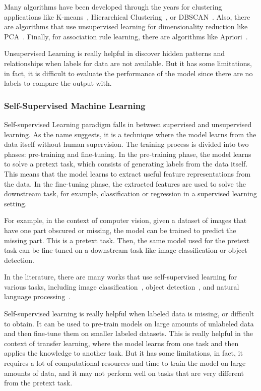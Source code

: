 Many algorithms have been developed through the years for clustering applications like K-means~\citep{macqueen1967some}, Hierarchical Clustering~\citep{johnson1967hierarchical}, or DBSCAN~\citep{ester1996density}.
Also, there are algorithms that use unsupervised learning for dimensionality reduction like PCA~\citep{jolliffe1986principal}.
Finally, for association rule learning, there are algorithms like Apriori~\citep{agrawal1994fast}.


Unsupervised Learning is really helpful in discover hidden patterns and relationships when labels for data are not available.
But it has some limitations, in fact, it is difficult to evaluate the performance of the model since there are no labels to compare the output with.



\subsubsection{Self-Supervised Machine Learning}
\label{subsubsec:semisupervised_ml}
Self-supervised Learning paradigm falls in between supervised and unsupervised learning.
As the name suggests, it is a technique where the model learns from the data itself without human supervision.
The training process is divided into two phases: pre-training and fine-tuning.
In the pre-training phase, the model learns to solve a pretext task, which consists of generating labels from the data itself.
This means that the model learns to extract useful feature representations from the data.
In the fine-tuning phase, the extracted features are used to solve the downstream task, for example, classification or regression in a supervised learning setting.


For example, in the context of computer vision, given a dataset of images that have one part obscured or missing, the model can be trained to predict the missing part.
This is a pretext task.
Then, the same model used for the pretext task can be fine-tuned on a downstream task like image classification or object detection.

In the literature, there are many works that use self-supervised learning for various tasks, including image classification~\citep{chen2020simple}, object detection~\citep{he2020momentum}, and natural language processing~\citep{devlin2018bert, radford2018improving}.


Self-supervised learning is really helpful when labeled data is missing, or difficult to obtain.
It can be used to pre-train models on large amounts of unlabeled data and then fine-tune them on smaller labeled datasets.
This is really helpful in the context of transfer learning, where the model learns from one task and then applies the knowledge to another task.
But it has some limitations, in fact, it requires a lot of computational resources and time to train the model on large amounts of data, and it may not perform well on tasks that are very different from the pretext task.

